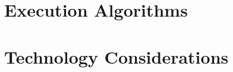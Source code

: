 \documentclass[krantz1,ChapterTOCs]{krantz}
\theoremstyle{plain}
\theoremstyle{custom}
\numberwithin{ex}{chapter}
\theoremstyle{remark}
\numberwithin{equation}{chapter}
\begin{document}
\part{Execution Algorithms}





\part{Technology Considerations}



%
%




\end{document}
